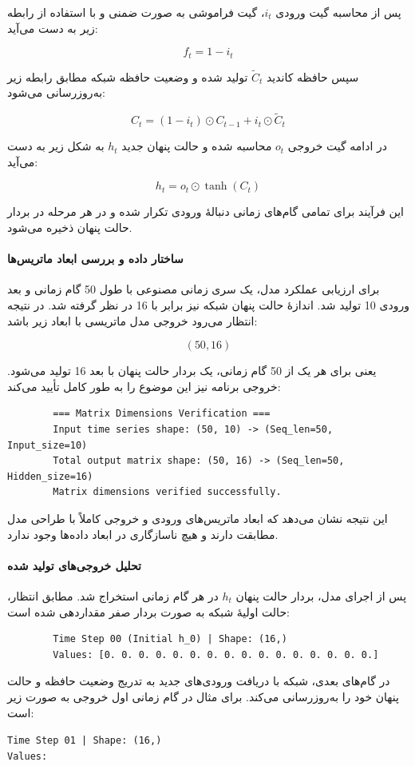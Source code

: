 \documentclass{article}
\begin{document}
پس از محاسبه گیت ورودی $i_t$، گیت فراموشی به صورت ضمنی و با استفاده از رابطه زیر به دست می‌آید:

\[
f_t = 1 - i_t
\]

سپس حافظه کاندید $\tilde{C}_t$ تولید شده و وضعیت حافظه شبکه مطابق رابطه زیر به‌روزرسانی می‌شود:

\[
C_t = (1 - i_t) \odot C_{t-1} + i_t \odot \tilde{C}_t
\]

در ادامه گیت خروجی $o_t$ محاسبه شده و حالت پنهان جدید $h_t$ به شکل زیر به دست می‌آید:

\[
h_t = o_t \odot \tanh(C_t)
\]

این فرآیند برای تمامی گام‌های زمانی دنبالۀ ورودی تکرار شده و در هر مرحله در بردار حالت پنهان ذخیره می‌شود.

\paragraph{ساختار داده و بررسی ابعاد ماتریس‌ها}
برای ارزیابی عملکرد مدل، یک سری زمانی مصنوعی با طول 50 گام زمانی و بعد ورودی 10 تولید شد. اندازۀ حالت پنهان شبکه نیز برابر با 16 در نظر گرفته شد. در نتیجه انتظار می‌رود خروجی مدل ماتریسی با ابعاد زیر باشد:

\[
(50, 16)
\]

یعنی برای هر یک از 50 گام زمانی، یک بردار حالت پنهان با بعد 16 تولید می‌شود. خروجی برنامه نیز این موضوع را به طور کامل تأیید می‌کند:

\begin{LTR}
	\begin{verbatim}
		=== Matrix Dimensions Verification ===
		Input time series shape: (50, 10) -> (Seq_len=50, Input_size=10)
		Total output matrix shape: (50, 16) -> (Seq_len=50, Hidden_size=16)
		Matrix dimensions verified successfully.
	\end{verbatim}
\end{LTR}


این نتیجه نشان می‌دهد که ابعاد ماتریس‌های ورودی و خروجی کاملاً با طراحی مدل مطابقت دارند و هیچ ناسازگاری در ابعاد داده‌ها وجود ندارد.

\paragraph{تحلیل خروجی‌های تولید شده}
پس از اجرای مدل، بردار حالت پنهان $h_t$ در هر گام زمانی استخراج شد. مطابق انتظار، حالت اولیۀ شبکه به صورت بردار صفر مقداردهی شده است:
\begin{LTR}
	\begin{verbatim}
		Time Step 00 (Initial h_0) | Shape: (16,)
		Values: [0. 0. 0. 0. 0. 0. 0. 0. 0. 0. 0. 0. 0. 0. 0. 0.]
	\end{verbatim}
\end{LTR}
در گام‌های بعدی، شبکه با دریافت ورودی‌های جدید به تدریج وضعیت حافظه و حالت پنهان خود را به‌روزرسانی می‌کند. برای مثال در گام زمانی اول خروجی به صورت زیر است:
\begin{LTR}
	\texttt{Time Step 01 | Shape: (16,)\\
		Values: \lr{[-0.031 -0.074 -0.025 -0.012 0.069 -0.064 -0.053 0.009
			0.008 0.037 0.037 0.039 0.081 0.092 0.002 -0.059]}
	}
\end{LTR}
\end{document}

